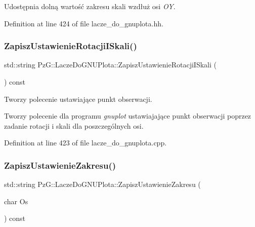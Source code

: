 Udostępnia dolną wartość zakresu skali wzdłuż osi {\itshape OY}. 

Definition at line 424 of file lacze\+\_\+do\+\_\+gnuplota.\+hh.

\mbox{\label{class_pz_g_1_1_lacze_do_g_n_u_plota_aa92b463e8cbae31b50dd797a4183bce8}} 
\subsubsection{\texorpdfstring{Zapisz\+Ustawienie\+Rotacji\+I\+Skali()}{ZapiszUstawienieRotacjiISkali()}}
{\footnotesize\ttfamily std\+::string Pz\+G\+::\+Lacze\+Do\+G\+N\+U\+Plota\+::\+Zapisz\+Ustawienie\+Rotacji\+I\+Skali (\begin{DoxyParamCaption}{ }\end{DoxyParamCaption}) const\hspace{0.3cm}{\ttfamily [protected]}}



Tworzy polecenie ustawiające punkt obserwacji. 

Tworzy polecenie dla programu {\itshape gnuplot} ustawiajające punkt obserwacji poprzez zadanie rotacji i skali dla poszczególnych osi. 

Definition at line 423 of file lacze\+\_\+do\+\_\+gnuplota.\+cpp.

\mbox{\label{class_pz_g_1_1_lacze_do_g_n_u_plota_a4579aecf7b4777fdde0cae4e98c275c2}} 
\subsubsection{\texorpdfstring{Zapisz\+Ustawienie\+Zakresu()}{ZapiszUstawienieZakresu()}}
{\footnotesize\ttfamily std\+::string Pz\+G\+::\+Lacze\+Do\+G\+N\+U\+Plota\+::\+Zapisz\+Ustawienie\+Zakresu (\begin{DoxyParamCaption}\item[{char}]{Os }\end{DoxyParamCaption}) const\hspace{0.3cm}{\ttfamily [protected]}}



